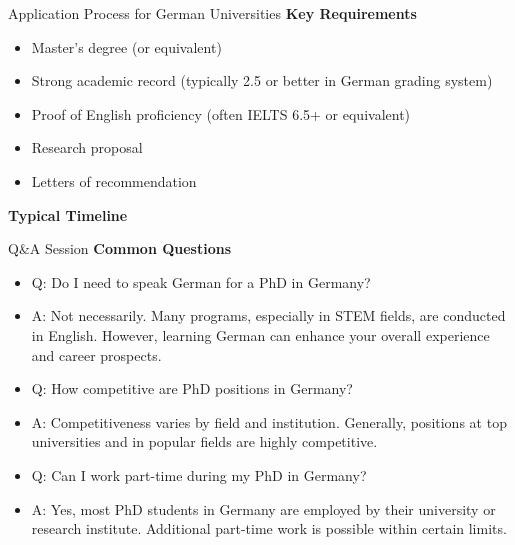 \documentclass[aspectratio=169,10pt]{beamer}
\begin{document}
\begin{frame}{Application Process for German Universities}
\textbf{Key Requirements}
\begin{itemize}
    \item Master's degree (or equivalent)
    \item Strong academic record (typically 2.5 or better in German grading system)
    \item Proof of English proficiency (often IELTS 6.5+ or equivalent)
    \item Research proposal
    \item Letters of recommendation
\end{itemize}

\vspace{0.5cm}

\textbf{Typical Timeline}
\end{frame}

\begin{frame}{Q\&A Session}
\textbf{Common Questions}
\begin{itemize}
    \item Q: Do I need to speak German for a PhD in Germany?
    \item A: Not necessarily. Many programs, especially in STEM fields, are conducted in English. However, learning German can enhance your overall experience and career prospects.
    
    \item Q: How competitive are PhD positions in Germany?
    \item A: Competitiveness varies by field and institution. Generally, positions at top universities and in popular fields are highly competitive.
    
    \item Q: Can I work part-time during my PhD in Germany?
    \item A: Yes, most PhD students in Germany are employed by their university or research institute. Additional part-time work is possible within certain limits.
\end{itemize}

\end{frame}
\end{document}
